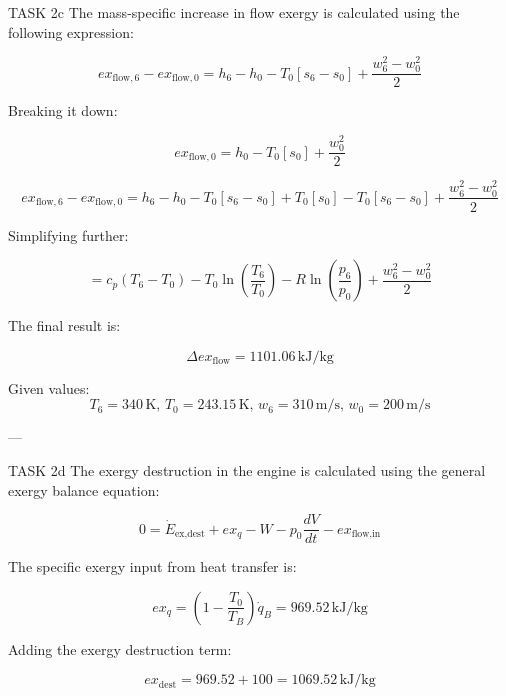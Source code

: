TASK 2c  
The mass-specific increase in flow exergy is calculated using the following expression:  

\[
ex_{\text{flow},6} - ex_{\text{flow},0} = h_6 - h_0 - T_0 \left[ s_6 - s_0 \right] + \frac{w_6^2 - w_0^2}{2}
\]

Breaking it down:  

\[
ex_{\text{flow},0} = h_0 - T_0 \left[ s_0 \right] + \frac{w_0^2}{2}
\]

\[
ex_{\text{flow},6} - ex_{\text{flow},0} = h_6 - h_0 - T_0 \left[ s_6 - s_0 \right] + T_0 \left[ s_0 \right] - T_0 \left[ s_6 - s_0 \right] + \frac{w_6^2 - w_0^2}{2}
\]

Simplifying further:  

\[
= c_p \left( T_6 - T_0 \right) - T_0 \ln \left( \frac{T_6}{T_0} \right) - R \ln \left( \frac{p_6}{p_0} \right) + \frac{w_6^2 - w_0^2}{2}
\]

The final result is:  

\[
\Delta ex_{\text{flow}} = 1101.06 \, \text{kJ/kg}
\]

Given values:  
\[
T_6 = 340 \, \text{K}, \, T_0 = 243.15 \, \text{K}, \, w_6 = 310 \, \text{m/s}, \, w_0 = 200 \, \text{m/s}
\]

---

TASK 2d  
The exergy destruction in the engine is calculated using the general exergy balance equation:  

\[
0 = \dot{E}_{\text{ex,dest}} + ex_q - W - p_0 \frac{dV}{dt} - ex_{\text{flow,in}}
\]

The specific exergy input from heat transfer is:  

\[
ex_q = \left( 1 - \frac{T_0}{T_B} \right) \dot{q}_B = 969.52 \, \text{kJ/kg}
\]

Adding the exergy destruction term:  

\[
ex_{\text{dest}} = 969.52 + 100 = 1069.52 \, \text{kJ/kg}
\]